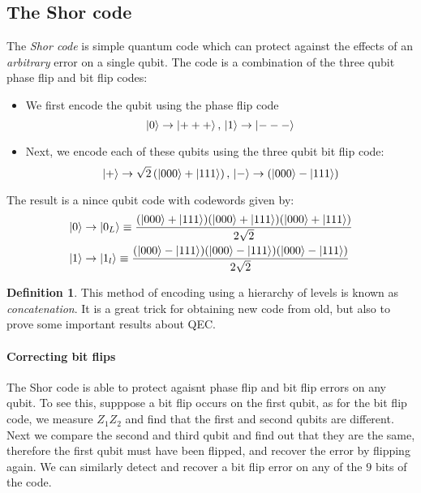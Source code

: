 \documentclass[11pt,a4paper]{article}
\theoremstyle{definition}
\newtheorem{definition}{Definition}[section]
\theoremstyle{plain}
\theoremstyle{remark}
\begin{document}
\subsection{The Shor code}
The \emph{Shor code} is simple quantum code which can protect against the effects of an \emph{arbitrary} error on a single qubit. 
The code is a combination of the three qubit phase flip and bit flip codes: 
\begin{itemize}
  \item We first encode the qubit using the phase flip code 
  $$\ket{0} \to \ket{+++}, \, \ket{1} \to \ket{---}$$

  \item Next, we encode each of these qubits using the three qubit bit flip code: 
  $$\ket{+} \to \sqrt{2} \left(\ket{000} + \ket{111}\right), \, \ket{-} \to \left(\ket{000} - \ket{111}\right)$$
\end{itemize}
The result is a nince qubit code with codewords given by: 
\begin{align*}
  \ket{0} &\to \ket{0_L} \equiv \frac{(\ket{000} + \ket{111}) (\ket{000} + \ket{111})(\ket{000} + \ket{111})}{2 \sqrt{2}} \\
  \ket{1} &\to \ket{1_l} \equiv \frac{(\ket{000} - \ket{111}) (\ket{000} - \ket{111})(\ket{000} - \ket{111})}{2 \sqrt{2}}
\end{align*}

\begin{definition}
  This method of encoding using a hierarchy of levels is known as \emph{concatenation}. It is a great trick for obtaining 
  new code from old, but also to prove some important results about QEC. 
\end{definition}

\paragraph{Correcting bit flips}
The Shor code is able to protect agaisnt phase flip and bit flip errors on any qubit. To see this, supppose a bit flip occurs on the first qubit, 
as for the bit flip code, we measure $Z_1 Z_2$ and find that the first and second qubits are different. Next we compare the second and third qubit 
and find out that they are the same, therefore the first qubit must have been flipped, and recover the error by flipping again. We can similarly detect and recover 
a bit flip error on any of the $9$ bits of the code. 
\end{document}
